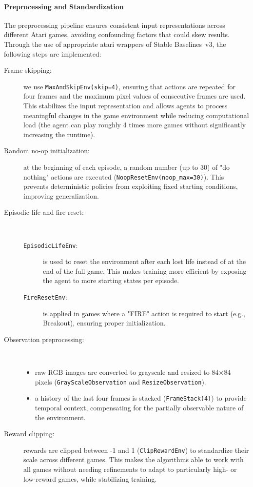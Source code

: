 \paragraph{Preprocessing and Standardization}
The preprocessing pipeline ensures consistent input representations across different Atari games, avoiding confounding factors that could skew results. Through the use of appropriate atari wrappers of Stable Baselines~v3, the following steps are implemented:
\begin{description}
	\item[Frame skipping:] we use \verb|MaxAndSkipEnv(skip=4)|, ensuring that actions are repeated for four frames and the maximum pixel values of consecutive frames are used. This stabilizes the input representation and allows agents to process meaningful changes in the game environment while reducing computational load (the agent can  play roughly 4 times more games without significantly increasing the runtime).
	\item[Random no-op initialization:] at the beginning of each episode, a random number (up to 30) of "do nothing" actions are executed (\verb|NoopResetEnv(noop_max=30)|). This prevents deterministic policies from exploiting fixed starting conditions, improving generalization.
	\item[Episodic life and fire reset:]\
	\begin{description}
		\item[\texttt{EpisodicLifeEnv}:] is used to reset the environment after each lost life instead of at the end of the full game. This makes training more efficient by exposing the agent to more starting states per episode.
		\item[\texttt{FireResetEnv}:] is applied in games where a "FIRE" action is required to start (e.g., Breakout), ensuring proper initialization.
	\end{description}
	\item[Observation preprocessing:]\
	\begin{itemize}
		\item raw RGB images are converted to grayscale and resized to 84×84 pixels (\verb|GrayScaleObservation| and \verb|ResizeObservation|).
		\item a history of the last four frames is stacked (\verb|FrameStack(4)|) to provide temporal context, compensating for the partially observable nature of the environment.
	\end{itemize}
	\item[Reward clipping:] rewards are clipped between -1 and 1 (\verb|ClipRewardEnv|) to standardize their scale across different games. This makes the algorithms able to work with all games without needing refinements to adapt to particularly high- or low-reward games, while stabilizing training.
\end{description}

